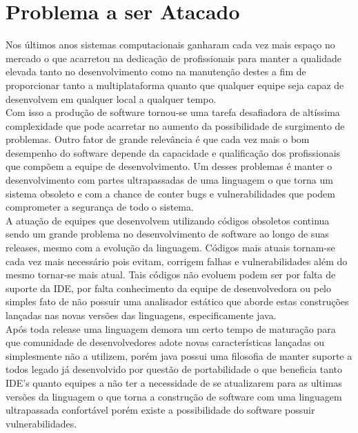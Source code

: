 \section{Problema a ser Atacado}

Nos últimos anos sistemas computacionais ganharam cada vez mais espaço no mercado o que acarretou na dedicação de profissionais para manter a qualidade elevada tanto no desenvolvimento como na manutenção destes a fim de proporcionar tanto a multiplataforma quanto que qualquer equipe seja capaz de desenvolvem em qualquer local a qualquer tempo.\\

Com isso a produção de software tornou-se uma tarefa desafiadora de altíssima complexidade que pode acarretar no aumento da possibilidade de surgimento de problemas. Outro fator de grande relevância é que cada vez mais o bom desempenho do software depende da capacidade e qualificação dos profissionais que compõem a equipe de desenvolvimento. Um desses problemas é manter o desenvolvimento com partes ultrapassadas de uma linguagem o que torna um sistema obsoleto e com a chance de conter bugs e vulnerabilidades que podem comprometer a segurança de todo o sistema.\\


A atuação de equipes que desenvolvem utilizando códigos obsoletos continua sendo um grande problema no desenvolvimento de software ao longo de suas releases, mesmo com a evolução da linguagem. Códigos mais atuais tornam-se cada vez mais necessário pois evitam, corrigem falhas e vulnerabilidades além do mesmo tornar-se mais atual. Tais códigos não evoluem podem ser por falta de suporte da IDE, por falta conhecimento da equipe de desenvolvedora ou pelo simples fato de não possuir uma analisador estático que aborde estas construções lançadas nas novas versões das linguagens, especificamente java.\\


Após toda release uma linguagem demora um certo tempo de maturação para que comunidade de desenvolvedores adote novas características lançadas ou simplesmente não a utilizem, porém java possui uma filosofia de manter suporte a todos legado já desenvolvido por questão de portabilidade o que beneficia tanto IDE's quanto equipes a não ter a necessidade de se atualizarem para as ultimas versões da linguagem o que torna a construção de software com uma linguagem ultrapassada confortável porém existe a possibilidade do software possuir vulnerabilidades.\\

